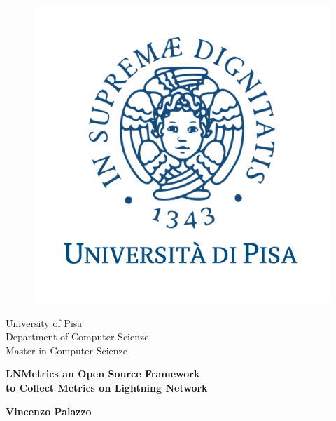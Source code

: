 \begin{titlepage}
\begin{figure}[!htb]
    \centering
    \includegraphics[keepaspectratio=true,scale=0.45]{format/img/unipi.png}
\end{figure}

\begin{center}
    \LARGE{University of Pisa}
    \vspace{5mm}
    \\ \large{Department of Computer Scienze}
    \vspace{5mm}
    \\ \LARGE{Master in Computer Scienze}
\end{center}

\vspace{3mm}
\begin{center}
    {\LARGE{\bf LNMetrics an Open Source Framework\\ \vspace{5mm} to Collect Metrics on Lightning Network }}\\
\end{center}
\vspace{8mm}

\begin{center}
    {\bf \large{Vincenzo Palazzo}\\ {}}
\end{center}


\end{titlepage}
